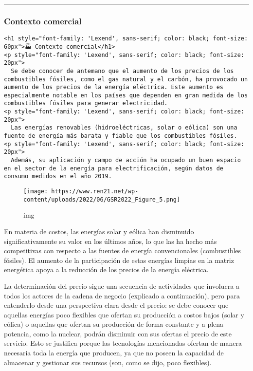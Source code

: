 \documentclass[11pt]{article}
\begin{document}
    \begin{center}\rule{0.5\linewidth}{0.5pt}\end{center}

\hypertarget{contexto-comercial}{%
\subsubsection{Contexto comercial}\label{contexto-comercial}}

\begin{verbatim}
<h1 style="font-family: 'Lexend', sans-serif; color: black; font-size: 60px">🏭 Contexto comercial</h1>
<p style="font-family: 'Lexend', sans-serif; color: black; font-size: 20px">
  Se debe conocer de antemano que el aumento de los precios de los combustibles fósiles, como el gas natural y el carbón, ha provocado un aumento de los precios de la energía eléctrica. Este aumento es especialmente notable en los países que dependen en gran medida de los combustibles fósiles para generar electricidad.
<p style="font-family: 'Lexend', sans-serif; color: black; font-size: 20px">
  Las energías renovables (hidroeléctricas, solar o eólica) son una fuente de energía más barata y fiable que los combustibles fósiles.
<p style="font-family: 'Lexend', sans-serif; color: black; font-size: 20px">
  Además, su aplicación y campo de acción ha ocupado un buen espacio en el sector de la energía para electrificación, según datos de consumo medidos en el año 2019.
\end{verbatim}

\begin{figure}
\centering
\texttt{[image: https://www.ren21.net/wp-content/uploads/2022/06/GSR2022\_Figure\_5.png]}
\caption{img}
\end{figure}

En materia de costos, las energías solar y eólica han disminuido
significativamente su valor en los últimos años, lo que las ha hecho más
competitivas con respecto a las fuentes de energía convencionales
(combustibles fósiles). El aumento de la participación de estas energías
limpias en la matriz energética apoya a la reducción de los precios de
la energía eléctrica.

La determinación del precio sigue una secuencia de actividades que
involucra a todos los actores de la cadena de negocio (explicado a
continuación), pero para entenderlo desde una perspectiva clara desde el
precio: se debe conocer que aquellas energías poco flexibles que ofertan
su producción a costos bajos (solar y eólica) o aquellas que ofertan su
producción de forma constante y a plena potencia, como la nuclear,
podrán disminuir con sus ofertas el precio de este servicio. Esto se
justifica porque las tecnologías mencionadas ofertan de manera necesaria
toda la energía que producen, ya que no poseen la capacidad de almacenar
y gestionar sus recursos (son, como se dijo, poco flexibles).
\end{document}
